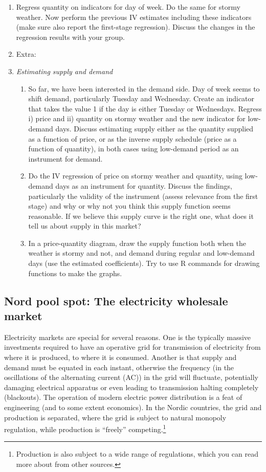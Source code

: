 \documentclass[12pt,a4paper]{article}
\begin{document}
\begin{enumerate}
 \item Regress quantity on indicators for day of week. Do the same for stormy weather. Now perform the previous IV estimates including these indicators (make sure also report the first-stage regression). Discuss the changes in the regression results with your group.
 \item Extra:
 \item[] \emph{Estimating supply and demand}
  \begin{enumerate}
  \item So far, we have been interested in the demand side. Day of week seems to shift demand, particularly Tuesday and Wednesday. Create an indicator that takes the value 1 if the day is either Tuesday or Wednesdays. Regress i) price and ii) quantity on stormy weather and the new indicator for low-demand days. Discuss estimating supply either as the quantity supplied as a function of price, or as the inverse supply schedule (price as a function of quantity), in both cases using low-demand period as an instrument for demand.
  \item Do the IV regression of price on stormy weather and quantity, using low-demand days as an instrument for quantity. Discuss the findings, particularly the validity of the instrument (assess relevance from the first stage) and why or why not you think this supply function seems reasonable. If we believe this supply curve is the right one, what does it tell us about supply in this market?
  \item In a price-quantity diagram, draw the supply function both when the weather is stormy and not, and demand during regular and low-demand days (use the estimated coefficients). Try to use R commands for drawing functions to make the graphs.
  \end{enumerate}
\end{enumerate}



\subsection*{Nord pool spot: The electricity wholesale market}
Electricity markets are special for several reasons. One is the typically massive investments required to have an operative grid for transmission of electricity from where it is produced, to where it is consumed. Another is that supply and demand must be equated in each instant, otherwise the frequency (in the oscillations of the alternating current (AC)) in the grid will fluctuate, potentially damaging electrical apparatus or even leading to transmission halting completely (blackouts). The operation of modern electric power distribution is a feat of engineering (and to some extent economics). In the Nordic countries, the grid and production is separated, where the grid is subject to natural monopoly regulation, while production is ``freely'' competing.\footnote{Production is also subject to a wide range of regulations, which you can read more about from other sources.}
\end{document}
